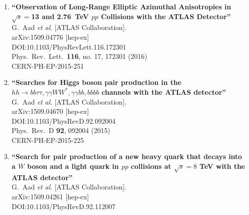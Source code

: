 \documentclass{article}
\begin{document}
\begin{enumerate}
{\bf ``A new method to distinguish hadronically decaying boosted $Z$ bosons from $W$ bosons using the ATLAS detector''}
  \\{}G.~Aad {\it et al.} [ATLAS Collaboration].
  \\{}arXiv:1509.04939 [hep-ex]
  \\{}DOI:10.1140/epjc/s10052-016-4065-1
  \\{}Eur.\ Phys.\ J.\ C {\bf 76}, no. 5, 238 (2016)
  \\{}CERN-PH-EP-2015-194
\item%
{\bf ``Observation of Long-Range Elliptic Azimuthal Anisotropies in $\sqrt{s}=$13 and 2.76 TeV $pp$ Collisions with the ATLAS Detector''}
  \\{}G.~Aad {\it et al.} [ATLAS Collaboration].
  \\{}arXiv:1509.04776 [hep-ex]
  \\{}DOI:10.1103/PhysRevLett.116.172301
  \\{}Phys.\ Rev.\ Lett.\  {\bf 116}, no. 17, 172301 (2016)
  \\{}CERN-PH-EP-2015-251
\item%
{\bf ``Searches for Higgs boson pair production in the $hh\to bb\tau\tau, \gamma\gamma WW^*, \gamma\gamma bb, bbbb$ channels with the ATLAS detector''}
  \\{}G.~Aad {\it et al.} [ATLAS Collaboration].
  \\{}arXiv:1509.04670 [hep-ex]
  \\{}DOI:10.1103/PhysRevD.92.092004
  \\{}Phys.\ Rev.\ D {\bf 92}, 092004 (2015)
  \\{}CERN-PH-EP-2015-225
\item%
{\bf ``Search for pair production of a new heavy quark that decays into a $W$ boson and a light quark in $pp$ collisions at $\sqrt{s} = 8$ TeV with the ATLAS detector''}
  \\{}G.~Aad {\it et al.} [ATLAS Collaboration].
  \\{}arXiv:1509.04261 [hep-ex]
  \\{}DOI:10.1103/PhysRevD.92.112007

\end{enumerate}
\end{document}
